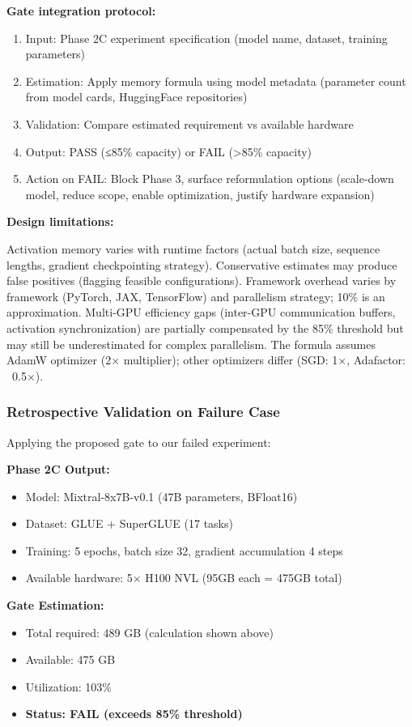 \textbf{Gate integration protocol:}
\begin{enumerate}
\item Input: Phase 2C experiment specification (model name, dataset, training parameters)
\item Estimation: Apply memory formula using model metadata (parameter count from model cards, HuggingFace repositories)
\item Validation: Compare estimated requirement vs available hardware
\item Output: PASS (≤85\% capacity) or FAIL (>85\% capacity)
\item Action on FAIL: Block Phase 3, surface reformulation options (scale-down model, reduce scope, enable optimization, justify hardware expansion)
\end{enumerate}

\textbf{Design limitations:}

Activation memory varies with runtime factors (actual batch size, sequence lengths, gradient checkpointing strategy). Conservative estimates may produce false positives (flagging feasible configurations). Framework overhead varies by framework (PyTorch, JAX, TensorFlow) and parallelism strategy; 10\% is an approximation. Multi-GPU efficiency gaps (inter-GPU communication buffers, activation synchronization) are partially compensated by the 85\% threshold but may still be underestimated for complex parallelism. The formula assumes AdamW optimizer (2× multiplier); other optimizers differ (SGD: 1×, Adafactor: ~0.5×).

\subsubsection{Retrospective Validation on Failure Case}

Applying the proposed gate to our failed experiment:

\textbf{Phase 2C Output:}
\begin{itemize}
\item Model: Mixtral-8x7B-v0.1 (47B parameters, BFloat16)
\item Dataset: GLUE + SuperGLUE (17 tasks)
\item Training: 5 epochs, batch size 32, gradient accumulation 4 steps
\item Available hardware: 5× H100 NVL (95GB each = 475GB total)
\end{itemize}

\textbf{Gate Estimation:}
\begin{itemize}
\item Total required: 489 GB (calculation shown above)
\item Available: 475 GB
\item Utilization: 103\%
\item \textbf{Status: FAIL (exceeds 85\% threshold)}
\end{itemize}

